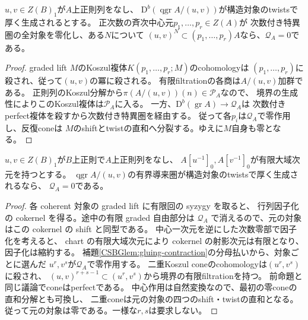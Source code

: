 \begin{proposition}[中心零化元による十分条件]
\label{CSBGprop:global-annihilators}
$u,v\in Z(B)_1$が$A$上正則列をなし、
$\mathrm D^b(\operatorname{qgr}A/(u,v))$が構造対象のtwistsで厚く生成されるとする。
正次数の斉次中心元$p_1,\ldots,p_r\in Z(A)$が
次数付き特異圏の全対象を零化し、ある$N$について
$(u,v)^N\subset(p_1,\ldots,p_r)A$なら、$\mathcal Q_A=0$である。
\end{proposition}
\begin{proof}
graded lift $M$のKoszul複体$K(p_1,\ldots,p_r;M)$のcohomologyは
$(p_1,\ldots,p_r)$に殺され、従って$(u,v)$の冪に殺される。
有限filtrationの各商は$A/(u,v)$加群である。
正則列のKoszul分解から$\pi(A/(u,v))(n)\in\mathcal P_A$なので、
境界の生成性によりこのKoszul複体は$\mathcal P_A$に入る。
一方、$\mathrm D^b(\operatorname{gr}A)\to\mathcal Q_A$は
次数付きperfect複体を殺すから次数付き特異圏を経由する。
従って各$p_i$は$\mathcal Q_A$で零作用し、反復coneは
$M$のshiftとtwistの直和へ分裂する。ゆえに$M$自身も零となる。
\end{proof}

\begin{proposition}[二つの中心chartの貼合せ]
\label{CSBGprop:global-two-charts}
$u,v\in Z(B)_1$が$B$上正則で$A$上正則列をなし、
$A[u^{-1}]_0,A[v^{-1}]_0$が有限大域次元を持つとする。
$\operatorname{qgr}A/(u,v)$の有界導来圏が構造対象のtwistsで厚く生成されるなら、
$\mathcal Q_A=0$である。
\end{proposition}
\begin{proof}
各 coherent 対象の graded lift に有限回の syzygy を取ると、
行列因子化の cokernel を得る。途中の有限 graded 自由部分は
$\mathcal Q_A$ で消えるので、元の対象はこの cokernel の shift と同型である。
中心一次元を逆にした次数零部で因子化を考えると、
chart の有限大域次元により cokernel の射影次元は有限となり、因子化は縮約する。
補題\ref{CSBGlem:gluing-contraction}の分母払いから、対象ごとに選んだ
$u^r,v^s$が$\mathcal Q_A$で零作用する。
二重Koszul coneのcohomologyは$(u^r,v^s)$に殺され、
$(u,v)^{r+s-1}\subset(u^r,v^s)$から境界の有限filtrationを持つ。
前命題と同じ議論でconeはperfectである。
中心作用は自然変換なので、最初の零coneの直和分解とも可換し、
二重coneは元の対象の四つのshift・twistの直和となる。
従って元の対象は零である。一様な$r,s$は要求しない。
\end{proof}

